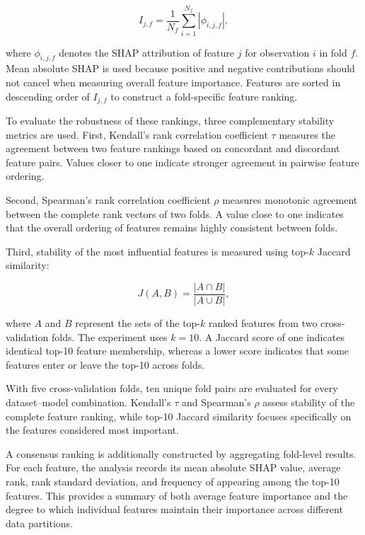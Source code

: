\begin{equation}
I_{j,f} =
\frac{1}{N_f}
\sum_{i=1}^{N_f}
|\phi_{i,j,f}|,
\end{equation}

where $\phi_{i,j,f}$ denotes the SHAP attribution of feature $j$ for observation
$i$ in fold $f$. Mean absolute SHAP is used because positive and negative
contributions should not cancel when measuring overall feature importance.
Features are sorted in descending order of $I_{j,f}$ to construct a
fold-specific feature ranking.

To evaluate the robustness of these rankings, three complementary stability
metrics are used. First, Kendall's rank correlation coefficient $\tau$ measures
the agreement between two feature rankings based on concordant and discordant
feature pairs. Values closer to one indicate stronger agreement in pairwise
feature ordering.

Second, Spearman's rank correlation coefficient $\rho$ measures monotonic
agreement between the complete rank vectors of two folds. A value close to one
indicates that the overall ordering of features remains highly consistent
between folds.

Third, stability of the most influential features is measured using top-$k$
Jaccard similarity:

\begin{equation}
J(A,B) =
\frac{|A \cap B|}
{|A \cup B|},
\end{equation}

where $A$ and $B$ represent the sets of the top-$k$ ranked features from two
cross-validation folds. The experiment uses $k=10$. A Jaccard score of one
indicates identical top-10 feature membership, whereas a lower score indicates
that some features enter or leave the top-10 across folds.

With five cross-validation folds, ten unique fold pairs are evaluated for every
dataset--model combination. Kendall's $\tau$ and Spearman's $\rho$ assess
stability of the complete feature ranking, while top-10 Jaccard similarity
focuses specifically on the features considered most important.

A consensus ranking is additionally constructed by aggregating fold-level
results. For each feature, the analysis records its mean absolute SHAP value,
average rank, rank standard deviation, and frequency of appearing among the
top-10 features. This provides a summary of both average feature importance and
the degree to which individual features maintain their importance across
different data partitions.

